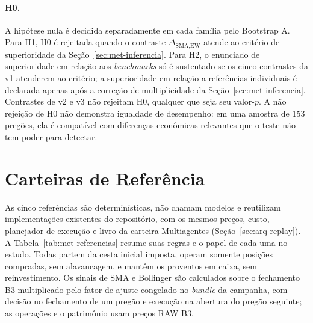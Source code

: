 \documentclass{eic-bcc-tcc}
\begin{document}
\paragraph{H0.} A hipótese nula é decidida separadamente em cada família pelo Bootstrap A. Para H1, H0 é rejeitada quando o contraste $\Delta_{\text{SMA},\text{EW}}$ atende ao critério de superioridade da Seção~\ref{sec:met-inferencia}. Para H2, o enunciado de superioridade em relação aos \textit{benchmarks} só é sustentado se os cinco contrastes da v1 atenderem ao critério; a superioridade em relação a referências individuais é declarada apenas após a correção de multiplicidade da Seção~\ref{sec:met-inferencia}. Contrastes de v2 e v3 não rejeitam H0, qualquer que seja seu valor-$p$. A não rejeição de H0 não demonstra igualdade de desempenho: em uma amostra de 153 pregões, ela é compatível com diferenças econômicas relevantes que o teste não tem poder para detectar.

\section{Carteiras de Referência}
\label{sec:met-referencias}

As cinco referências são determinísticas, não chamam modelos e reutilizam implementações existentes do repositório, com os mesmos preços, custo, planejador de execução e livro da carteira Multiagentes (Seção~\ref{sec:arq-replay}). A Tabela~\ref{tab:met-referencias} resume suas regras e o papel de cada uma no estudo. Todas partem da cesta inicial imposta, operam somente posições compradas, sem alavancagem, e mantêm os proventos em caixa, sem reinvestimento. Os sinais de SMA e Bollinger são calculados sobre o fechamento B3 multiplicado pelo fator de ajuste congelado no \textit{bundle} da campanha, com decisão no fechamento de um pregão e execução na abertura do pregão seguinte; as operações e o patrimônio usam preços RAW B3.
\end{document}
